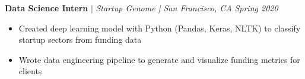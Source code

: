 \documentclass[margin]{res}
\begin{document}
\begin{resume}
   \textbf{Data Science Intern} $\mid$ \textit{Startup Genome | San Francisco, CA} \hfill {\sl Spring 2020}
    \begin{itemize}
        \item Created deep learning model with Python (Pandas, Keras, NLTK) to classify startup sectors from funding data 
        \item Wrote data engineering pipeline to generate and visualize funding metrics for clients
    \end{itemize} \vspace*{-10pt}

\end{resume}
\end{document}
